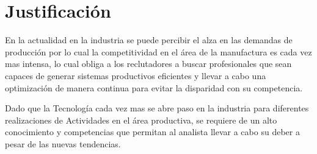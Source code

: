         
        
         
    
    \section{Justificación}
    En la actualidad en la industria se puede percibir el alza en las demandas de producción por lo cual la competitividad en el área de la manufactura es cada vez mas intensa, lo cual obliga a los reclutadores a buscar profesionales que sean capaces de generar sistemas productivos eficientes y llevar a cabo una optimización de manera continua para evitar la disparidad con su competencia.
    
    Dado que la Tecnología cada vez mas se abre paso en la industria para diferentes realizaciones de Actividades en el área productiva, se requiere de un alto conocimiento y competencias que permitan al analista 
    llevar a cabo su deber a pesar de las nuevas tendencias.
    
